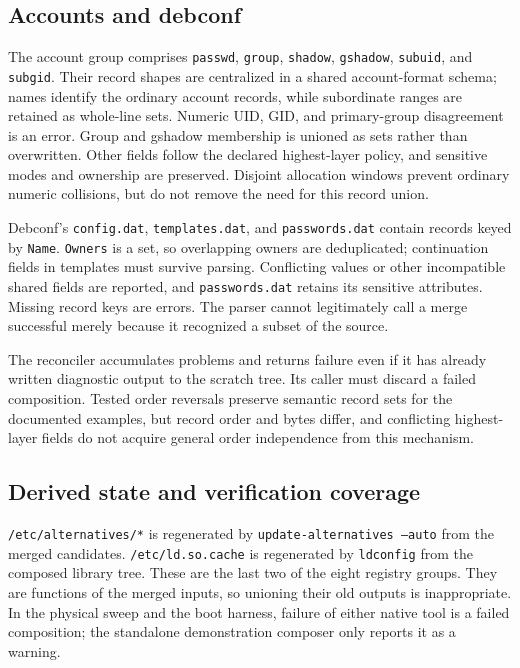 \subsection{Accounts and debconf}
\label{sec:arch:accounts}

The account group comprises \texttt{passwd}, \texttt{group}, \texttt{shadow}, \texttt{gshadow}, \texttt{subuid}, and \texttt{subgid}. Their record shapes are centralized in a shared account-format schema; names identify the ordinary account records, while subordinate ranges are retained as whole-line sets. Numeric \ac{UID}, \ac{GID}, and primary-group disagreement is an error. Group and gshadow membership is unioned as sets rather than overwritten. Other fields follow the declared highest-layer policy, and sensitive modes and ownership are preserved. Disjoint allocation windows prevent ordinary numeric collisions, but do not remove the need for this record union.

Debconf's \texttt{config.dat}, \texttt{templates.dat}, and \texttt{passwords.dat} contain records keyed by \texttt{Name}. \texttt{Owners} is a set, so overlapping owners are deduplicated; continuation fields in templates must survive parsing. Conflicting values or other incompatible shared fields are reported, and \texttt{passwords.dat} retains its sensitive attributes. Missing record keys are errors. The parser cannot legitimately call a merge successful merely because it recognized a subset of the source.

The reconciler accumulates problems and returns failure even if it has already written diagnostic output to the scratch tree. Its caller must discard a failed composition. Tested order reversals preserve semantic record sets for the documented examples, but record order and bytes differ, and conflicting highest-layer fields do not acquire general order independence from this mechanism.

\subsection{Derived state and verification coverage}
\label{sec:arch:derived}

\texttt{/etc/alternatives/*} is regenerated by \texttt{update-alternatives --auto} from the merged candidates. \texttt{/etc/ld.so.cache} is regenerated by \texttt{ldconfig} from the composed library tree. These are the last two of the eight registry groups. They are functions of the merged inputs, so unioning their old outputs is inappropriate. In the physical sweep and the boot harness, failure of either native tool is a failed composition; the standalone demonstration composer only reports it as a warning.

